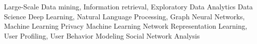 \begin{cventries}
    \cventryint
    {Large-Scale Data mining, Information retrieval, Exploratory Data Analytics
    }
    {Data Science}
    \cventryint
    {Deep Learning, Natural Language Processing, Graph Neural Networks, Machine Learning Privacy
    }
    {Machine Learning}
  \cventryint
    {Network Representation Learning, User Profiling, User Behavior Modeling
    }
    {Social Network Analysis}
\end{cventries}
